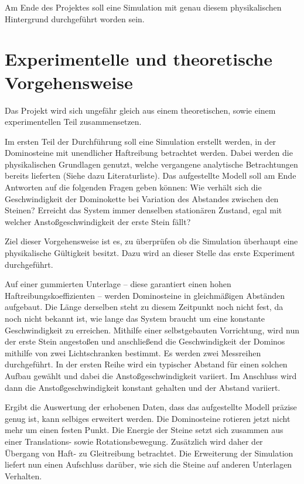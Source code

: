 \documentclass[11pt,a4paper]{scrartcl}
\begin{document}
Am Ende des Projektes soll eine Simulation mit genau diesem physikalischen
Hintergrund durchgeführt worden sein.


\section{Experimentelle und theoretische Vorgehensweise}
Das Projekt wird sich ungefähr gleich aus einem theoretischen, sowie einem experimentellen Teil zusammensetzen.

Im ersten Teil der Durchführung soll eine Simulation erstellt werden, in der Dominosteine mit unendlicher Haftreibung betrachtet werden. Dabei werden die physikalischen Grundlagen genutzt, welche vergangene analytische Betrachtungen bereits lieferten (Siehe dazu Literaturliste).
Das aufgestellte Modell soll am Ende Antworten auf die folgenden Fragen geben können:
Wie verhält sich die Geschwindigkeit der Dominokette bei Variation des Abstandes zwischen den Steinen? Erreicht das System immer denselben stationären Zustand, egal mit welcher Anstoßgeschwindigkeit der erste Stein fällt?

Ziel dieser Vorgehensweise ist es, zu überprüfen ob die Simulation überhaupt eine physikalische Gültigkeit besitzt. Dazu wird an dieser Stelle das erste Experiment durchgeführt.

Auf einer gummierten Unterlage – diese garantiert einen hohen Haftreibungskoeffizienten – werden Dominosteine in gleichmäßigen Abständen aufgebaut. Die Länge derselben steht zu diesem Zeitpunkt noch nicht fest, da noch nicht bekannt ist, wie lange das System braucht um eine konstante Geschwindigkeit zu erreichen.
Mithilfe einer selbstgebauten Vorrichtung, wird nun der erste Stein angestoßen und anschließend die Geschwindigkeit der Dominos mithilfe von zwei Lichtschranken bestimmt. Es werden zwei Messreihen durchgeführt.
In der ersten Reihe wird ein typischer Abstand für einen solchen Aufbau gewählt und dabei die Anstoßgeschwindigkeit variiert. Im Anschluss wird dann die Anstoßgeschwindigkeit konstant gehalten und der Abstand variiert.

Ergibt die Auswertung der erhobenen Daten, dass das aufgestellte Modell präzise genug ist, kann selbiges erweitert werden. Die Dominosteine rotieren jetzt nicht mehr um einen festen Punkt. Die Energie der Steine setzt sich zusammen aus einer Translations- sowie Rotationsbewegung. Zusätzlich wird daher der Übergang von Haft- zu Gleitreibung betrachtet.
Die Erweiterung der Simulation liefert nun einen Aufschluss darüber, wie sich die Steine auf anderen Unterlagen Verhalten.
\end{document}

